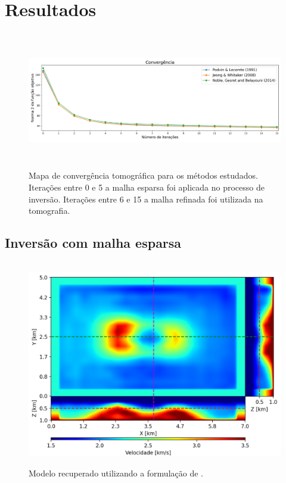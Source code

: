 \chapter{Resultados}
\label{ch:resultados}


\begin{figure}[H]
	\centering
	\includegraphics[width=16cm,height=6cm]{Imgs/Resultados/convergencia.png}
	\caption{Mapa de convergência tomográfica para os métodos estudados. Iterações entre 0 e 5 a malha esparsa foi aplicada no processo de inversão. Iterações entre 6 e 15 a malha refinada foi utilizada na tomografia.}
	\label{fig:convergencia}	
\end{figure}



\section{Inversão com malha esparsa}



\begin{figure}[H]
	\centering
	\includegraphics[width=12cm,height=9cm]{Imgs/Resultados/pod_sparse.png}
	\caption{Modelo recuperado utilizando a formulação de .}
	\label{fig:pod_sparse}	
\end{figure}


